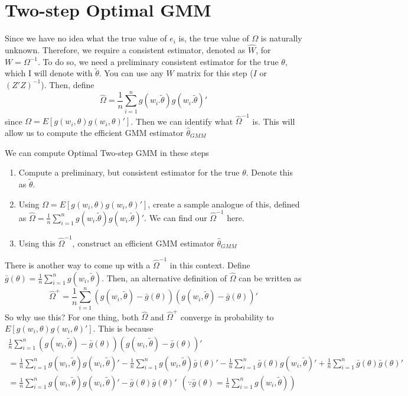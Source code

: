\section{Two-step Optimal GMM}
Since we have no idea what the true value of $e_i$ is, the true value of $\Omega$ is naturally unknown. Therefore, we require a consistent estimator, denoted as $\widehat{W}$, for $W=\Omega^{-1}$. To do so, we need a preliminary consistent estimator for the true $\theta$, which I will denote with $\tilde{\theta}$. You can use any $W$ matrix for this step ($I$ or $(Z'Z)^{-1}$). Then, define
\[
\widehat{\Omega}=\frac{1}{n}\sum_{i=1}^n g(w_i.\tilde{\theta})g(w_i.\tilde{\theta})'
\]
since $\Omega = E[g(w_i,\theta)g(w_i,\theta)']$. Then we can identify what $\widehat{\Omega}^{-1}$ is. This will allow us to compute the efficient GMM estimator $\hat{\theta}_{GMM}$
\begin{mdframed}[backgroundcolor=blue!5] 
\begin{definition} We can compute Optimal Two-step GMM in these steps
\begin{enumerate}
\item Compute a preliminary, but consistent estimator for the true $\theta$. Denote this as $\tilde{\theta}$. 
\item Using $\Omega=E[g(w_i,\theta)g(w_i,\theta)']$, create a sample analogue of this, defined as $\widehat{\Omega}=\frac{1}{n}\sum_{i=1}^n g(w_i.\tilde{\theta})g(w_i.\tilde{\theta})'$. We can find our $\widehat{\Omega}^{-1}$ here. 
\item Using this $\widehat{\Omega}^{-1}$, construct an efficient GMM estimator $\hat{\theta}_{GMM}$
\end{enumerate}
\end{definition}
\end{mdframed}\par
There is another way to come up with a $\widehat{\Omega}^{-1}$ in this context. Define $\bar{g}(\theta)=\frac{1}{n}\sum_{i=1}^ng(w_i,\tilde{\theta})$. Then, an alternative definition of $\widehat{\Omega}$ can be written as
\[
\widehat{\Omega}^+=\frac{1}{n}\sum_{i=1}^n(g(w_i,\tilde{\theta})-\bar{g}(\theta))(g(w_i,\tilde{\theta})-\bar{g}(\theta))'
\]
So why use this? For one thing, both $\widehat{\Omega}$ and $\widehat{\Omega}^+$ converge in probability to $E[g(w_i,\theta)g(w_i,\theta)']$. This is because
\begin{gather*}
\frac{1}{n}\sum_{i=1}^n(g(w_i,\tilde{\theta})-\bar{g}(\theta))(g(w_i,\tilde{\theta})-\bar{g}(\theta))'\\
=\frac{1}{n}\sum_{i=1}^ng(w_i,\tilde{\theta})g(w_i,\tilde{\theta})'-\frac{1}{n}\sum_{i=1}^ng(w_i,\tilde{\theta})\bar{g}(\theta)'-\frac{1}{n}\sum_{i=1}^n\bar{g}(\theta)g(w_i,\tilde{\theta})'+\frac{1}{n}\sum_{i=1}^n \bar{g}(\theta)\bar{g}(\theta)'\\
=\frac{1}{n}\sum_{i=1}^ng(w_i,\tilde{\theta})g(w_i,\tilde{\theta})'- \bar{g}(\theta)\bar{g}(\theta)' \ \ \left(\because \bar{g}(\theta)=\frac{1}{n}\sum_{i=1}^ng(w_i,\tilde{\theta})\right)\\
\end{gather*}
